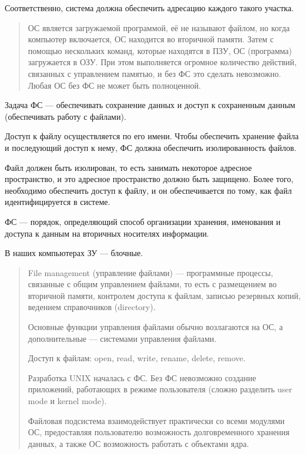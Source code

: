 Соответственно, система должна обеспечить адресацию каждого такого участка.

\begin{quote}
	ОС является загружаемой программой, её не называют файлом, но когда компьютер включается, ОС находится во вторичной памяти. Затем с помощью нескольких команд, которые находятся в ПЗУ, ОС (программа) загружается в ОЗУ. При этом выполняется огромное количество действий, связанных с управлением памятью, и без ФС это сделать невозможно. Любая ОС без ФС не может быть полноценной.
\end{quote}

Задача ФС --- обеспечивать сохранение данных и доступ к сохраненным данным (обеспечивать работу с файлами).

Доступ к файлу осуществляется по его имени. Чтобы обеспечить хранение файла и последующий доступ к нему, ФС должна обеспечить изолированность файлов.

Файл должен быть изолирован, то есть занимать некоторое адресное пространство, и это адресное пространство должно быть защищено. Более того, необходимо обеспечить доступ к файлу, и он обеспечивается по тому, как файл идентифицируется в системе.

ФС --- порядок, определяющий способ организации хранения, именования и доступа к данным на вторичных носителях информации.

В наших компьютерах ЗУ --- блочные.

\begin{quote}
	File management (управление файлами) --- программные процессы, связанные с общим управлением файлами, то есть с размещением во вторичной памяти, контролем доступа к файлам, записью резервных копий, ведением справочников (directory).
	
	Основные функции управления файлами обычно возлагаются на ОС, а дополнительные --- системами управления файлами.
	
	Доступ к файлам: open, read, write, rename, delete, remove.
	
	Разработка UNIX началась с ФС. Без ФС невозможно создание приложений, работающих в режиме пользователя (сложно разделить user mode и kernel mode).
	
	Файловая подсистема взаимодействует практически со всеми модулями ОС, предоставляя пользователю возможность долговременного хранения данных, а также ОС возможность работать с объектами ядра.
\end{quote}

